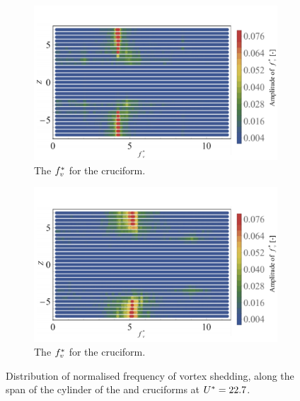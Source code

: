 \documentclass[oneside]{utmthesis}
\begin{document}
\begin{figure}
  \centering

  \begin{subfigure}[h]{1\textwidth}
    \includegraphics[width=\textwidth]{figs/probe675YU10}
    \caption{The $f^{*}_{v}$ for the \angfo{} cruciform.}
    \label{fig:probe675YU10}
  \end{subfigure}

  \begin{subfigure}[h]{1\textwidth}
    \includegraphics[width=\textwidth]{figs/probe45YU10}
    \caption{The $f^{*}_{v}$ for the \angth{} cruciform.}
    \label{fig:probe45YU10}
  \end{subfigure}

  \caption{Distribution of normalised frequency of vortex shedding, along the span of the cylinder of the \angfo{} and \angth{} cruciforms at $U^{*} = 22.7$.}
  \label{fig:probe67545YU10}
\end{figure}
\end{document}
